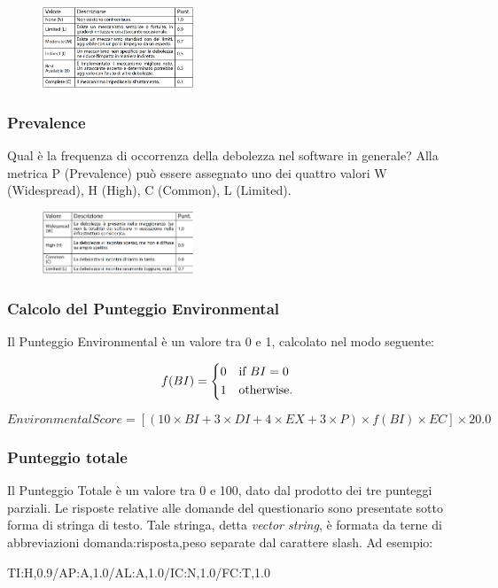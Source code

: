 \begin{figure}[hbpt!]
    \centering
    \includegraphics[width=0.4\textwidth]{./Images/cap3/3.18.png}
\end{figure}
\FloatBarrier

\subsubsection{Prevalence}
Qual è la frequenza di occorrenza della
debolezza nel software in generale? Alla metrica P (Prevalence) può essere
assegnato uno dei quattro valori
W (Widespread), H (High), C (Common), L (Limited).

\begin{figure}[hbpt!]
    \centering
    \includegraphics[width=0.4\textwidth]{./Images/cap3/3.19.png}
\end{figure}
\FloatBarrier

\subsubsection{Calcolo del Punteggio Environmental}
Il Punteggio Environmental è un valore tra 0 e 1,
calcolato nel modo seguente:

\[f(BI) = \begin{dcases*}
        0 & if $BI = 0$\\
        1 & otherwise. 
        \end{dcases*}
        \]
        
\[EnvironmentalScore = [(10 \times BI + 3 \times DI + 4 \times EX +3 \times P) \times f(BI) \times EC] \times 20.0\]

\subsubsection{Punteggio totale}
Il Punteggio Totale è un valore tra 0 e 100,
dato dal prodotto dei tre punteggi parziali. Le risposte relative alle domande del questionario sono
presentate sotto forma di stringa di testo. Tale stringa, detta \textit{vector string}, è formata da terne
di abbreviazioni domanda:risposta,peso separate dal
carattere slash. Ad esempio:
\begin{center}
    TI:H,0.9/AP:A,1.0/AL:A,1.0/IC:N,1.0/FC:T,1.0 
\end{center}

